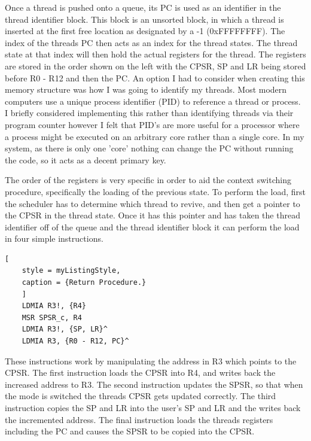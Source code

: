 Once a thread is pushed onto a queue, its PC is used as an identifier in the thread identifier block. This block is an unsorted block, in which a thread is inserted at the first free location as designated by a -1 (0xFFFFFFFF). The index of the threads PC then acts as an index for the thread states. The thread state at that index will then hold the actual registers for the thread. The registers are stored in the order shown on the left with the CPSR, SP and LR being stored before R0 - R12 and then the PC. An option I had to consider when creating this memory structure was how I was going to identify my threads. Most modern computers use a unique process identifier (PID) to reference a thread or process. %
I briefly considered implementing this rather than identifying threads via their program counter however I felt that PID's are more useful for a processor where a process might be executed on an arbitrary core rather than a single core. In my system, as there is only one 'core' nothing can change the PC without running the code, so it acts as a decent primary key.

The order of the registers is very specific in order to aid the context switching procedure, specifically the loading of the previous state. To perform the load, first the scheduler has to determine which thread to revive, and then get a pointer to the CPSR in the thread state. Once it has this pointer and has taken the thread identifier off of the queue and the thread identifier block it can perform the load in four simple instructions.

\begin{lstlisting}[
	style = myListingStyle,
	caption = {Return Procedure.}
	]
	LDMIA R3!, {R4}
	MSR SPSR_c, R4
	LDMIA R3!, {SP, LR}^
	LDMIA R3, {R0 - R12, PC}^
\end{lstlisting}

These instructions work by manipulating the address in R3 which points to the CPSR. The first instruction loads the CPSR into R4, and writes back the increased address to R3. The second instruction updates the SPSR, so that when the mode is switched the threads CPSR gets updated correctly. The third instruction copies the SP and LR into the user's SP and LR and the writes back the incremented address. The final instruction loads the threads registers including the PC and causes the SPSR to be copied into the CPSR.

